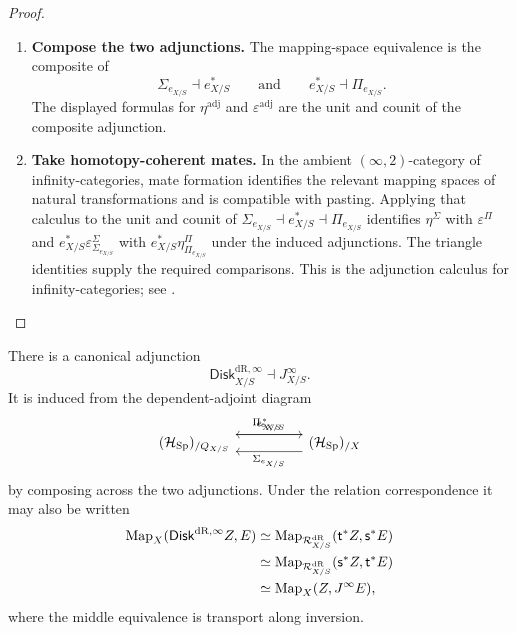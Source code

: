 \begin{proof}
\leavevmode
\begin{enumerate}[label=\textup{(\arabic*)}]
    \item \textbf{Compose the two adjunctions.}
The mapping-space equivalence is the composite of
\[
  \Sigma_{e_{X/S}}\dashv e_{X/S}^*
  \qquad\text{and}\qquad
  e_{X/S}^*\dashv\Pi_{e_{X/S}}.
\]
The displayed formulas for \(\eta^{\mathrm{adj}}\) and \(\varepsilon^{\mathrm{adj}}\) are the unit and counit of
the composite adjunction.

    \item \textbf{Take homotopy-coherent mates.}
In the ambient \((\infty,2)\)-category of infinity-categories, mate formation
identifies the relevant mapping spaces of natural transformations and is
compatible with pasting. Applying that calculus to the
unit and counit of
\(\Sigma_{e_{X/S}}\dashv e_{X/S}^*\dashv\Pi_{e_{X/S}}\) identifies
\(\eta^\Sigma\) with \(\varepsilon^\Pi\) and
\(e_{X/S}^*\varepsilon^\Sigma_{\Sigma_{e_{X/S}}}\) with
\(e_{X/S}^*\eta^\Pi_{\Pi_{e_{X/S}}}\) under the induced adjunctions. The triangle identities supply the required comparisons. This is the
adjunction calculus for infinity-categories; see
\cite{LurieHTT,LurieHigherAlgebra}.
\end{enumerate}
\end{proof}

\begin{corollary}
\label{thm:disk-jet-adjunction}
There is a canonical adjunction
\[
  \mathsf{Disk}^{\mathrm{dR},\infty}_{X/S}\dashv J^\infty_{X/S}.
\]
It is induced from the dependent-adjoint diagram
\[
\begin{tikzcd}[column sep=huge]
(\mathcal H_{\Sp})_{/Q_{X/S}}
  \ar[r,shift left=1.4ex,"e_{X/S}^*"]
&
(\mathcal H_{\Sp})_{/X}
  \ar[l,shift left=1.4ex,"\Sigma_{e_{X/S}}"]
  \ar[l,shift right=1.4ex,"\Pi_{e_{X/S}}"']
\end{tikzcd}
\]
by composing across the two adjunctions.
Under the relation correspondence it may also be written
\[
\begin{aligned}
\operatorname{Map}_X(\mathsf{Disk}^{\mathrm{dR},\infty} Z,E)
&\simeq \operatorname{Map}_{\mathcal R^{\mathrm{dR}}_{X/S}}(\mathsf t^*Z,\mathsf s^*E)\\
&\simeq \operatorname{Map}_{\mathcal R^{\mathrm{dR}}_{X/S}}(\mathsf s^*Z,\mathsf t^*E)\\
&\simeq \operatorname{Map}_X(Z,J^\infty E),
\end{aligned}
\]
where the middle equivalence is transport along inversion.
\end{corollary}

